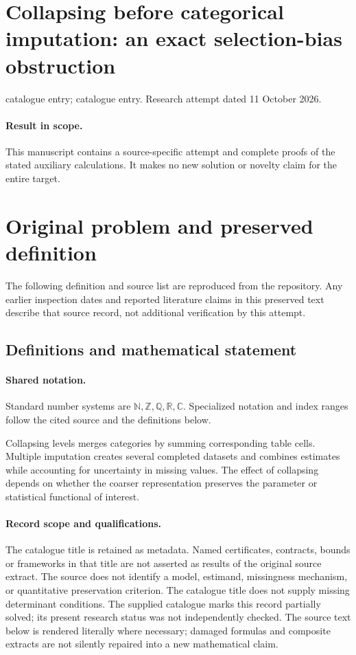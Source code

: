\documentclass[11pt]{article}
\begin{document}
\section*{Collapsing before categorical imputation: an exact selection-bias obstruction}
\noindent catalogue entry; catalogue entry. Research attempt dated 11 October 2026.
\paragraph{Result in scope.}This manuscript contains a source-specific attempt and complete proofs of the stated auxiliary calculations. It makes no new solution or novelty claim for the entire target.
\section{Original problem and preserved definition}
The following definition and source list are reproduced from the repository. Any earlier inspection dates and reported literature claims in this preserved text describe that source record, not additional verification by this attempt.
\subsection{Definitions and mathematical statement}

\paragraph{Shared notation.}Standard number systems are $\mathbb N,\mathbb Z,\mathbb Q,\mathbb R,\mathbb C$. Specialized notation and index ranges follow the cited source and the definitions below.


Collapsing levels merges categories by summing corresponding table cells. Multiple imputation creates several completed datasets and combines estimates while accounting for uncertainty in missing values. The effect of collapsing depends on whether the coarser representation preserves the parameter or statistical functional of interest.
\paragraph{Record scope and qualifications.}
The catalogue title is retained as metadata. Named certificates, contracts, bounds or frameworks in that title are not asserted as results of the original source extract.
The source does not identify a model, estimand, missingness mechanism, or quantitative preservation criterion. The catalogue title does not supply missing determinant conditions. The supplied catalogue marks this record partially solved; its present research status was not independently checked.
The source text below is rendered literally where necessary; damaged formulas and composite extracts are not silently repaired into a new mathematical claim.
\end{document}
